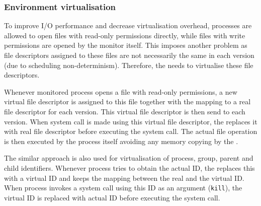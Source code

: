 
\subsubsection{Environment virtualisation}

To improve I/O performance and decrease virtualisation overhead,
processes are allowed to open files with read-only permissions
directly, while files with write permissions are opened by the monitor
itself.  This imposes another problem as file descriptors assigned to
these files are not necessarily the same in each version (\eg due to
scheduling non-determinism). Therefore, the \mxm needs to virtualise
these file descriptors.

Whenever monitored process opens a file with read-only permissions, a
new virtual file descriptor is assigned to this file together with the
mapping to a real file descriptor for each version. This virtual file
descriptor is then send to each version. When system call is made
using this virtual file descriptor, the \mxm replaces it with real
file descriptor before executing the system call. The actual file
operation is then executed by the process itself avoiding any memory
copying by the \mxm.

The similar approach is also used for virtualisation of process,
group, parent and child identifiers.  Whenever process tries to obtain
the actual ID, the \mxm replaces this with a virtual ID and keeps the
mapping between the real and the virtual ID. When process invokes a
system call using this ID as an argument (\eg \texttt{kill}), the
virtual ID is replaced with actual ID before executing the system
call.



